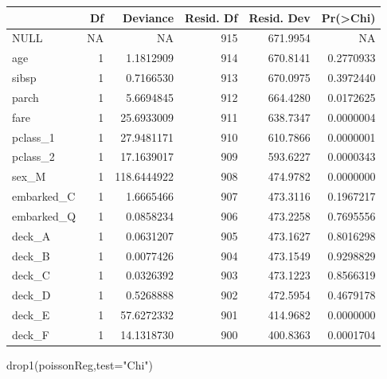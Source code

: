 \documentclass[
  letterpaper,
  DIV=11,
  numbers=noendperiod]{scrartcl}
\newenvironment{Shaded}{\begin{snugshade}}{\end{snugshade}}
\newcommand{\AttributeTok}[1]{\textcolor[rgb]{0.40,0.45,0.13}{#1}}
\newcommand{\FunctionTok}[1]{\textcolor[rgb]{0.28,0.35,0.67}{#1}}
\newcommand{\NormalTok}[1]{\textcolor[rgb]{0.00,0.23,0.31}{#1}}
\newcommand{\StringTok}[1]{\textcolor[rgb]{0.13,0.47,0.30}{#1}}
\begin{document}
\begin{longtable}[]{@{}lrrrrr@{}}
\toprule\noalign{}
& Df & Deviance & Resid. Df & Resid. Dev & Pr(\textgreater Chi) \\
\midrule\noalign{}
\endhead
\bottomrule\noalign{}
\endlastfoot
NULL & NA & NA & 915 & 671.9954 & NA \\
age & 1 & 1.1812909 & 914 & 670.8141 & 0.2770933 \\
sibsp & 1 & 0.7166530 & 913 & 670.0975 & 0.3972440 \\
parch & 1 & 5.6694845 & 912 & 664.4280 & 0.0172625 \\
fare & 1 & 25.6933009 & 911 & 638.7347 & 0.0000004 \\
pclass\_1 & 1 & 27.9481171 & 910 & 610.7866 & 0.0000001 \\
pclass\_2 & 1 & 17.1639017 & 909 & 593.6227 & 0.0000343 \\
sex\_M & 1 & 118.6444922 & 908 & 474.9782 & 0.0000000 \\
embarked\_C & 1 & 1.6665466 & 907 & 473.3116 & 0.1967217 \\
embarked\_Q & 1 & 0.0858234 & 906 & 473.2258 & 0.7695556 \\
deck\_A & 1 & 0.0631207 & 905 & 473.1627 & 0.8016298 \\
deck\_B & 1 & 0.0077426 & 904 & 473.1549 & 0.9298829 \\
deck\_C & 1 & 0.0326392 & 903 & 473.1223 & 0.8566319 \\
deck\_D & 1 & 0.5268888 & 902 & 472.5954 & 0.4679178 \\
deck\_E & 1 & 57.6272332 & 901 & 414.9682 & 0.0000000 \\
deck\_F & 1 & 14.1318730 & 900 & 400.8363 & 0.0001704 \\
\end{longtable}

\begin{Shaded}
\begin{Highlighting}[]
\FunctionTok{drop1}\NormalTok{(poissonReg,}\AttributeTok{test=}\StringTok{"Chi"}\NormalTok{)}
\end{Highlighting}
\end{Shaded}
\end{document}
